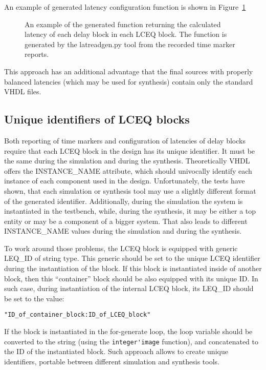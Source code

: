 \documentclass[preprint,11pt]{elsarticle}
\begin{document}
An example of generated latency configuration function is shown in Figure~\ref{fig:read-lat-ex}
	\begin{figure}
	\begin{minipage}{\linewidth}
	{
\scriptsize
\begin{multicols}{2}

	\end{multicols}
	}
	\end{minipage}
	\vspace{3mm}
	\caption{\label{fig:read-lat-ex}
	An example of the generated function returning the calculated latency of each delay block in each LCEQ block.
	The function is generated by the latreadgen.py tool from the recorded time marker reports.
	}
	\end{figure}

This approach has an additional advantage that the final sources with properly
balanced latencies (which may be used for synthesis) contain only the standard
VHDL files.
\subsection{Unique identifiers of LCEQ blocks}
Both reporting of time markers and configuration of latencies of delay blocks require
that each LCEQ block in the design has its unique identifier. It must be the same 
during the simulation and during the synthesis.
Theoretically VHDL offers the INSTANCE\_NAME attribute, which should univocally identify each instance of each component used in the design. Unfortunately, the tests have shown, that each simulation or synthesis tool may use a slightly different
format of the generated identifier. Additionally, during the simulation the system is instantiated in the testbench, while, during the synthesis, it may be either a
top entity or may be a component of a bigger system. That also leads
to different INSTANCE\_NAME values during the simulation and during the synthesis.

To work around those problems, the LCEQ block is equipped with generic LEQ\_ID of string type. This generic should be set to the unique LCEQ identifier during the instantiation
of the block.
If this block is instantiated inside of another block, then this ``container'' block
should be also equipped with its unique ID.
In such case, during instantiation of the internal LCEQ block, its  LEQ\_ID should be set to the value:

\verb|"ID_of_container_block:ID_of_LCEQ_block"|

If the block is instantiated in the for-generate loop, the loop variable should be converted to the string (using the \verb|integer'image| function), and concatenated to the ID of the instantiated block.
Such approach allows to create unique identifiers, portable between different simulation and synthesis tools.
\end{document}

